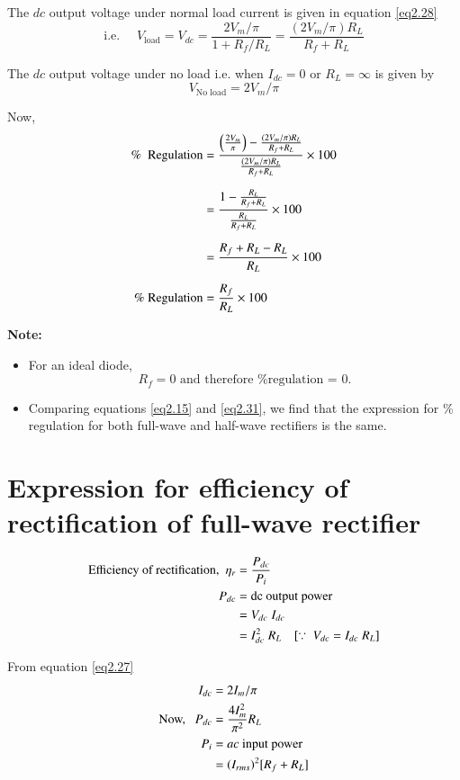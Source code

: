 The $dc$ output voltage under normal load current is given in equation
\eqref{eq2.28}
$$
\text{i.e. } \quad V_{\text{load}} = V_{dc} = \frac{2V_m/\pi}{1+ R_f
  /R_L} = \frac{(2 V_m/\pi) R_L}{R_f+ R_L}
$$

The $dc$ output voltage under no load i.e. when $I_{dc} = 0$ or $R_L =
\infty$ is given by
$$
V_{\text{No load}} = 2 V_m/\pi
$$

Now,
\begin{align}
\% ~ \text{ Regulation} & = \frac{\left(\frac{2V_m}{\pi} \right) -
  \frac{(2V_m/\pi) R_L}{R_f+ R_L}}{\frac{(2V_{m}/\pi) R_L}{R_f + R_L}}
\times 100 \notag\\[6pt]
& = \frac{1- \frac{R_L}{R_f + R_L}}{ \frac{R_L}{R_f + R_L}} \times
100 \notag\\[6pt]
& = \frac{R_f + R_L - R_L}{R_L} \times 100 \notag\\[6pt]
\% ~ \text{Regulation} & = \frac{R_f}{R_L} \times 100 \label{eq2.31}
\end{align}

\smallskip
\noindent\textbf{Note:}
\begin{itemize}
\item For an ideal diode,
$$
R_f = 0 \text{ and therefore \ \ \% regulation = 0}.
$$

\item Comparing equations \eqref{eq2.15} and \eqref{eq2.31}, we
  find that the expression for \% regulation for both full-wave and
  half-wave rectifiers is the same.
\end{itemize}

\eject

\section{Expression for efficiency of rectification of full-wave
  rectifier}\label{sec2.12}
\begin{align}
\text{Efficiency of rectification, }~ \eta_r & =
\frac{P_{dc}}{P_i} \label{eq2.32}\\
P_{dc} & = \text{dc output power} \notag\\
& = V_{dc}\; I_{dc} \notag\\
& = I^2_{dc}\; R_L \quad [\because ~ V_{dc} = I_{dc}\; R_L] \notag
\end{align}

From equation \eqref{eq2.27}
\begin{align}
I_{dc} & = 2 I_m /\pi \notag\\
\text{Now, } ~~ P_{dc} & = \frac{4 I^2_m}{\pi^2} R_L \label{eq2.33}\\
P_i & = ac \text{ input power} \notag\\
& = (I_{rms})^2 [R_f + R_L] \notag
\end{align}

